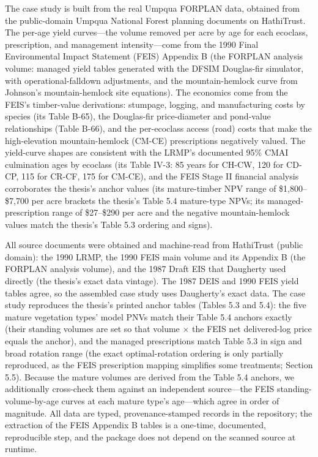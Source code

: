 The case study is built from the real Umpqua FORPLAN data, obtained from the public-domain Umpqua National Forest planning documents on HathiTrust. The per-age yield curves---the volume removed per acre by age for each ecoclass, prescription, and management intensity---come from the 1990 Final Environmental Impact Statement (FEIS) Appendix B \citep{usda1990umpqua} (the FORPLAN analysis volume: managed yield tables generated with the DFSIM Douglas-fir simulator, with operational-falldown adjustments, and the mountain-hemlock curve from Johnson's mountain-hemlock site equations). The economics come from the FEIS's timber-value derivations: stumpage, logging, and manufacturing costs by species (its Table B-65), the Douglas-fir price-diameter and pond-value relationships (Table B-66), and the per-ecoclass access (road) costs that make the high-elevation mountain-hemlock (CM-CE) prescriptions negatively valued. The yield-curve shapes are consistent with the LRMP's documented 95\% CMAI culmination ages by ecoclass (its Table IV-3: 85 years for CH-CW, 120 for CD-CP, 115 for CR-CF, 175 for CM-CE), and the FEIS Stage II financial analysis corroborates the thesis's anchor values (its mature-timber NPV range of \$1,800--\$7,700 per acre brackets the thesis's Table 5.4 mature-type NPVs; its managed-prescription range of \$27--\$290 per acre and the negative mountain-hemlock values match the thesis's Table 5.3 ordering and signs).

All source documents were obtained and machine-read from HathiTrust (public domain): the 1990 LRMP, the 1990 FEIS main volume and its Appendix B (the FORPLAN analysis volume), and the 1987 Draft EIS \citep{usda1987umpqua} that Daugherty used directly (the thesis's exact data vintage). The 1987 DEIS and 1990 FEIS yield tables agree, so the assembled case study uses Daugherty's exact data. The case study reproduces the thesis's printed anchor tables (Tables 5.3 and 5.4): the five mature vegetation types' model PNVs match their Table 5.4 anchors exactly (their standing volumes are set so that volume $\times$ the FEIS net delivered-log price equals the anchor), and the managed prescriptions match Table 5.3 in sign and broad rotation range (the exact optimal-rotation ordering is only partially reproduced, as the FEIS prescription mapping simplifies some treatments; Section 5.5). Because the mature volumes are derived from the Table 5.4 anchors, we additionally cross-check them against an independent source---the FEIS standing-volume-by-age curves at each mature type's age---which agree in order of magnitude. All data are typed, provenance-stamped records in the repository; the extraction of the FEIS Appendix B tables is a one-time, documented, reproducible step, and the package does not depend on the scanned source at runtime.

